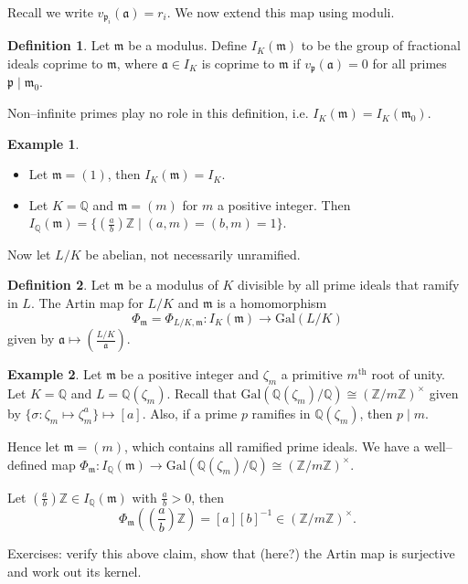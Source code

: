\documentclass{article}
\theoremstyle{definition}
\newtheorem{example}{Example}[section]
\newtheorem{defn}{Definition}[section]
\begin{document}

Recall we write $v_{\mathfrak{p}_i}(\mathfrak{a}) = r_i$. We now extend this map using moduli.

\begin{defn}
    Let $\mathfrak{m}$ be a modulus. Define $I_K(\mathfrak{m})$ to be the group of fractional ideals coprime to $\mathfrak{m}$, where $\mathfrak{a} \in I_K$ is coprime to $\mathfrak{m}$ if $v_{\mathfrak{p}}(\mathfrak{a})=0$ for all primes $\mathfrak{p} \mid \mathfrak{m}_0$.
\end{defn}
Non--infinite primes play no role in this definition, i.e. $I_K(\mathfrak{m}) = I_K(\mathfrak{m}_0)$. 
\begin{example}
    \begin{itemize}
        \item Let $\mathfrak{m} = (1)$, then $I_K(\mathfrak{m}) = I_K$.
        \item Let $K = \mathbb{Q}$ and $\mathfrak{m} = (m)$ for $m$ a positive integer. Then $I_{\mathbb{Q}}(\mathfrak{m}) = \{\left(\frac{a}{b}\right)\mathbb{Z} \mid (a,m)=(b,m)=1\}$.
    \end{itemize}
\end{example}
Now let $L/K$ be abelian, not necessarily unramified.
\begin{defn}
    Let $\mathfrak{m}$ be a modulus of $K$ divisible by all prime ideals that ramify in $L$. The Artin map for $L/K$ and $\mathfrak{m}$ is a homomorphism \[
    \Phi_{\mathfrak{m}} = \Phi_{L/K, \mathfrak{m}} : I_K(\mathfrak{m}) \to \text{Gal}(L/K)
    \]
    given by $\mathfrak{a} \mapsto \left(\frac{L/K}{\mathfrak{a}}\right)$.
\end{defn}
\begin{example}
    Let $\mathfrak{m}$ be a positive integer and $\zeta_m$ a primitive $m^{\text{th}}$ root of unity. Let $K=\mathbb{Q}$ and $L = \mathbb{Q}(\zeta_m)$. Recall that $\text{Gal}(\mathbb{Q}(\zeta_m)/\mathbb{Q}) \cong (\mathbb{Z}/m\mathbb{Z})^\times$ given by $\{\sigma: \zeta_m \mapsto \zeta_m^a\} \mapsto [a]$. Also, if a prime $p$ ramifies in $\mathbb{Q}(\zeta_m)$, then $p \mid m$.
    \vspace{1mm}
     
    Hence let $\mathfrak{m} = (m)$, which contains all ramified prime ideals. We have a well--defined map $\Phi_{\mathfrak{m}} : I_{\mathbb{Q}}(\mathfrak{m}) \to \text{Gal}(\mathbb{Q}(\zeta_m)/\mathbb{Q}) \cong (\mathbb{Z}/m\mathbb{Z})^\times$.
    \vspace{1mm}
     
    Let $\left(\frac{a}{b}\right)\mathbb{Z} \in I_\mathbb{Q}(\mathfrak{m})$ with $\frac{a}{b}>0$, then \[
    \Phi_{\mathfrak{m}} \left( \left(\frac{a}{b}\right)\mathbb{Z}\right) = [a][b]^{-1} \in (\mathbb{Z}/m\mathbb{Z})^\times.
    \]
\end{example}
Exercises: verify this above claim, show that (here?) the Artin map is surjective and work out its kernel.
\end{document}
